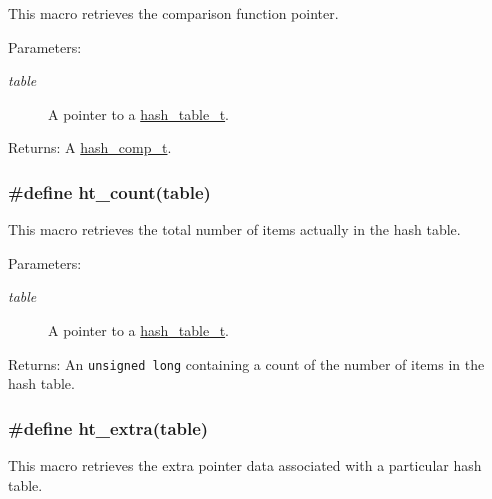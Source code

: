 This macro retrieves the comparison function pointer.

\begin{Desc}
\item[Parameters:]
\begin{description}
\item[{\em table}]A pointer to a \hyperlink{group__dbprim__hash_a0}{hash\_\-table\_\-t}.\end{description}
\end{Desc}
\begin{Desc}
\item[Returns:]A \hyperlink{group__dbprim__hash_a4}{hash\_\-comp\_\-t}. \end{Desc}
\hypertarget{group__dbprim__hash_a23}{
\subsubsection[ht\_\-count]{\setlength{\rightskip}{0pt plus 5cm}\#define ht\_\-count(table)}}
\label{group__dbprim__hash_a23}


This macro retrieves the total number of items actually in the hash table.

\begin{Desc}
\item[Parameters:]
\begin{description}
\item[{\em table}]A pointer to a \hyperlink{group__dbprim__hash_a0}{hash\_\-table\_\-t}.\end{description}
\end{Desc}
\begin{Desc}
\item[Returns:]An {\tt unsigned long} containing a count of the number of items in the hash table. \end{Desc}
\hypertarget{group__dbprim__hash_a27}{
\subsubsection[ht\_\-extra]{\setlength{\rightskip}{0pt plus 5cm}\#define ht\_\-extra(table)}}
\label{group__dbprim__hash_a27}


This macro retrieves the extra pointer data associated with a particular hash table.


